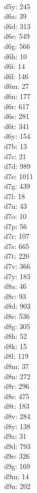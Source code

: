 \begin{multicols}{8}
  \\ d5y: 245
  \\ d6a: 39
  \\ d6d: 313
  \\ d6e: 549
  \\ d6g: 566
  \\ d6h: 10
  \\ d6i: 14
  \\ d6l: 146
  \\ d6m: 27
  \\ d6n: 177
  \\ d6r: 617
  \\ d6s: 281
  \\ d6t: 341
  \\ d6y: 154
  \\ d7b: 13
  \\ d7c: 21
  \\ d7d: 989
  \\ d7e: 1011
  \\ d7g: 439
  \\ d7l: 18
  \\ d7n: 43
  \\ d7o: 10
  \\ d7p: 56
  \\ d7r: 107
  \\ d7s: 665
  \\ d7t: 220
  \\ d7v: 366
  \\ d7y: 183
  \\ d8a: 46
  \\ d8c: 93
  \\ d8d: 903
  \\ d8e: 536
  \\ d8g: 305
  \\ d8h: 52
  \\ d8k: 15
  \\ d8l: 119
  \\ d8m: 37
  \\ d8n: 272
  \\ d8r: 296
  \\ d8s: 475
  \\ d8t: 183
  \\ d8v: 284
  \\ d8y: 138
  \\ d9a: 31
  \\ d9d: 793
  \\ d9e: 326
  \\ d9g: 169
  \\ d9m: 14
  \\ d9n: 202

\end{multicols}
